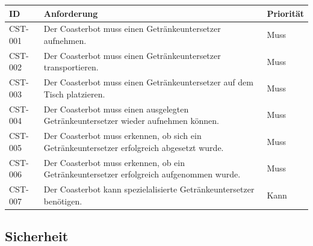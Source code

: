 \documentclass[
  a4paper,
  12pt,
  DIV=12,        %
  parskip=half,  %
  headings=small %
]{scrartcl}
\theoremstyle{definition}
\theoremstyle{definition}
\begin{document}
\begin{longtable}[]{@{}
  >{\raggedright\arraybackslash}p{}
  >{\raggedright\arraybackslash}p{}
  >{\raggedright\arraybackslash}p{}@{}}
\toprule\noalign{}
\begin{minipage}[b]{\linewidth}\raggedright
ID
\end{minipage} & \begin{minipage}[b]{\linewidth}\raggedright
Anforderung
\end{minipage} & \begin{minipage}[b]{\linewidth}\raggedright
Priorität
\end{minipage} \\
\midrule\noalign{}
\endhead
\bottomrule\noalign{}
\endlastfoot
CST-001 & Der Coasterbot muss einen Getränkeuntersetzer aufnehmen. &
Muss \\
CST-002 & Der Coasterbot muss einen Getränkeuntersetzer transportieren.
& Muss \\
CST-003 & Der Coasterbot muss einen Getränkeuntersetzer auf dem Tisch
platzieren. & Muss \\
CST-004 & Der Coasterbot muss einen ausgelegten Getränkeuntersetzer
wieder aufnehmen können. & Muss \\
CST-005 & Der Coasterbot muss erkennen, ob sich ein Getränkeuntersetzer
erfolgreich abgesetzt wurde. & Muss \\
CST-006 & Der Coasterbot muss erkennen, ob ein Getränkeuntersetzer
erfolgreich aufgenommen wurde. & Muss \\
CST-007 & Der Coasterbot kann spezielalisierte Getränkeuntersetzer
benötigen. & Kann \\
\end{longtable}

\subsection{Sicherheit}\label{sicherheit}
\end{document}
